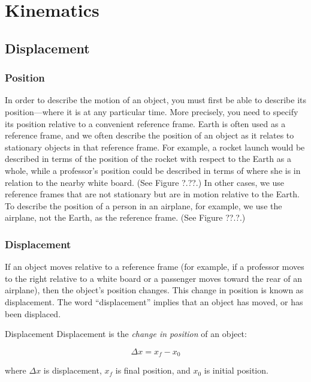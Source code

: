 \documentclass[../../main-ap-physics.tex]{subfiles}
\begin{document}
\section{Kinematics}

\subsection{Displacement} \label{iThIct}

\subsubsection*{Position}

In order to describe the motion of an object, you must first be able to describe its \gls{position}---where it is at any particular time. More precisely, you need to specify its position relative to a convenient reference frame. Earth is often used as a reference frame, and we often describe the position of an object as it relates to stationary objects in that reference frame. For example, a rocket launch would be described in terms of the position of the rocket with respect to the Earth as a whole, while a professor's position could be described in terms of where she is in relation to the nearby white board. (See Figure ?.??.) In other cases, we use reference frames that are not stationary but are in motion relative to the Earth. To describe the position of a person in an airplane, for example, we use the airplane, not the Earth, as the reference frame. (See Figure ??.?.)

\subsubsection*{Displacement} \label{awplYI}

If an object moves relative to a reference frame (for example, if a professor moves to the right relative to a white board or a passenger moves toward the rear of an airplane), then the object's position changes. This change in position is known as \gls{displacement}. The word ``displacement'' implies that an object has moved, or has been displaced.

\begin{gradient}{Displacement}
    Displacement is the \textit{change in position} of an object:
    
    \begin{equation} \label{PhLnzc}
        \Delta{x} = x_f - x_0
    \end{equation}
    
    where $\Delta{x}$ is displacement, $x_f$ is final position, and $x_0$ is initial position.
\end{gradient}
\end{document}
